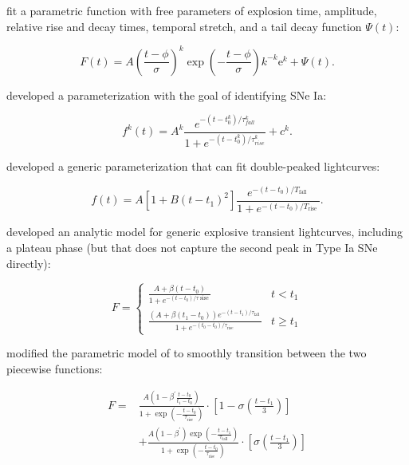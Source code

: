 \documentclass[DM,authoryear,toc]{lsstdoc}
\begin{document}
\citet{Newling:11:SNPhotCCClassification} fit a parametric function with free parameters of explosion time, amplitude, relative rise and decay times, temporal stretch, and a tail decay function $\Psi(t)$:

\begin{equation}
  F(t)=A\left(\frac{t-\phi}{\sigma}\right)^{k} \exp \left(-\frac{t-\phi}{\sigma}\right) k^{-k} \mathrm{e}^{k}+\Psi(t).
\end{equation}

\citet{Bazin:11:SNLSIas} developed a parameterization with the goal of identifying SNe Ia:

\begin{equation}
  f^{k}(t)=A^{k} \frac{e^{-\left(t-t_{0}^{k}\right) / \tau_{f a l l}^{k}}}{1+e^{-\left(t-t_{0}^{k}\right) / \tau_{r i s e}^{k}}}+c^{k}.
\end{equation}

\citet{Karpenka:13:SNClassification} developed a generic parameterization that can fit double-peaked lightcurves:

\begin{equation}
f(t)=A\left[1+B\left(t-t_{1}\right)^{2}\right] \frac{e^{-\left(t-t_{0}\right) / T_{\text {fall }}}}{1+e^{-\left(t-t_{0}\right) / T_{\text {rise }}}}.
\end{equation}

\citet{Villar:19:Supernova-Photo} developed an analytic model for generic explosive transient lightcurves, including a plateau phase (but that does not capture the second peak in Type Ia SNe directly):

\begin{equation}
F=\left\{\begin{array}{ll}{\frac{A+\beta\left(t-t_{0}\right)}{1+e^{-\left(t-t_{0}\right) / \tau \operatorname{sise}}}} & {t<t_{1}} \\ {\frac{\left(A+\beta\left(t_{1}-t_{0}\right)\right) e^{-\left(t-t_{1}\right) / \tau_{\text {fall }}}}{1+e^{-\left(t_{0}-t_{0}\right) / \tau_{\text {rise }}}}} & {t \geq t_{1}}\end{array}\right.
\end{equation}

\citet{Sanchez-Saez:21:AlertClassification} modified the parametric model of \citet{Villar:19:Supernova-Photo} to smoothly transition between the two piecewise functions:

\begin{equation}
\begin{aligned}
  F=& \frac{A\left(1-\beta^{\prime} \frac{t-t_{0}}{t_{1}-t_{0}}\right)}{1+\exp \left(-\frac{t-t_{0}}{\tau_{\text {rise }}}\right)} \cdot\left[1-\sigma\left(\frac{t-t_{1}}{3}\right)\right] \\
  &+\frac{A\left(1-\beta^{\prime}\right) \exp \left(-\frac{t-t_{1}}{\tau_{\text {tall }}}\right)}{1+\exp \left(-\frac{t-t_{0}}{\tau_{\text {rise }}}\right)} \cdot\left[\sigma\left(\frac{t-t_{1}}{3}\right)\right]
  \end{aligned}
\end{equation}
\end{document}
